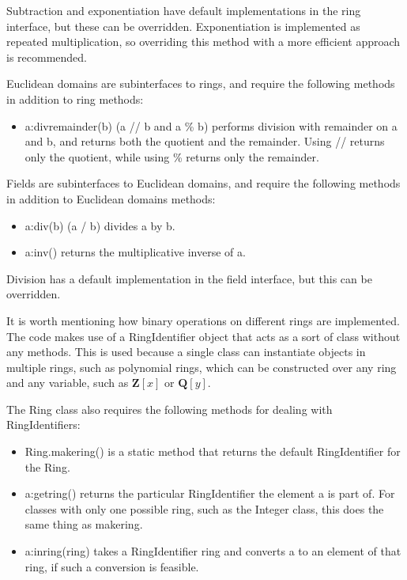\documentclass{article}
\begin{document}
Subtraction and exponentiation have default implementations in the ring interface, but these can be overridden. Exponentiation is implemented as repeated multiplication, so overriding this method with a more efficient approach is recommended.

Euclidean domains are subinterfaces to rings, and require the following methods in addition to ring methods:

\begin{itemize}
    \item {\ttfamily a:divremainder(b)} ({\ttfamily a // b} and {\ttfamily a \% b}) performs division with remainder on {\ttfamily a} and {\ttfamily b}, and returns both the quotient and the remainder. Using {\ttfamily //} returns only the quotient, while using {\ttfamily \%} returns only the remainder.
\end{itemize}

Fields are subinterfaces to Euclidean domains, and require the following methods in addition to Euclidean domains methods:

\begin{itemize}
    \item {\ttfamily a:div(b)} ({\ttfamily a / b}) divides {\ttfamily a} by {\ttfamily b}.
    \item {\ttfamily a:inv()} returns the multiplicative inverse of {\ttfamily a}.
\end{itemize}

Division has a default implementation in the field interface, but this can be overridden.

It is worth mentioning how binary operations on different rings are implemented. The code makes use of a {\ttfamily RingIdentifier} object that acts as a sort of class without any methods. This is used because a single class can instantiate objects in multiple rings, such as polynomial rings, which can be constructed over any ring and any variable, such as $\mathbf{Z}[x]$ or $\mathbf{Q}[y]$.

The {\ttfamily Ring} class also requires the following methods for dealing with {\ttfamily RingIdentifier}s:

\begin{itemize}
    \item {\ttfamily Ring.makering()} is a static method that returns the default {\ttfamily RingIdentifier} for the {\ttfamily Ring}.
    
    \item {\ttfamily a:getring()} returns the particular {\ttfamily RingIdentifier} the element {\ttfamily a} is part of.  For classes with only one possible ring, such as the {\ttfamily Integer} class, this does the same thing as {\ttfamily makering}.
    
    \item {\ttfamily a:inring(ring)} takes a {\ttfamily RingIdentifier} ring and converts {\ttfamily a} to an element of that ring, if such a conversion is feasible. 
\end{itemize}
\end{document}
